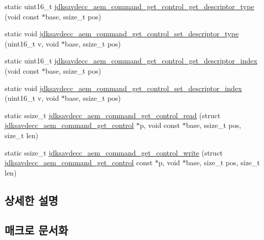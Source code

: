 \begin{DoxyCompactItemize}
static uint16\+\_\+t \hyperlink{group__command__get__control_ga90f0fc2993ae0173e6b9ce2c6020440d}{jdksavdecc\+\_\+aem\+\_\+command\+\_\+get\+\_\+control\+\_\+get\+\_\+descriptor\+\_\+type} (void const $\ast$base, ssize\+\_\+t pos)
\item 
static void \hyperlink{group__command__get__control_ga5b685187fafd639322cdee542dcd80d2}{jdksavdecc\+\_\+aem\+\_\+command\+\_\+get\+\_\+control\+\_\+set\+\_\+descriptor\+\_\+type} (uint16\+\_\+t v, void $\ast$base, ssize\+\_\+t pos)
\item 
static uint16\+\_\+t \hyperlink{group__command__get__control_ga92af56dbbaac901e328c3c1b60b7ca47}{jdksavdecc\+\_\+aem\+\_\+command\+\_\+get\+\_\+control\+\_\+get\+\_\+descriptor\+\_\+index} (void const $\ast$base, ssize\+\_\+t pos)
\item 
static void \hyperlink{group__command__get__control_ga0782470ec152cdffee65c219ec629c03}{jdksavdecc\+\_\+aem\+\_\+command\+\_\+get\+\_\+control\+\_\+set\+\_\+descriptor\+\_\+index} (uint16\+\_\+t v, void $\ast$base, ssize\+\_\+t pos)
\item 
static ssize\+\_\+t \hyperlink{group__command__get__control_gae47bc21ffda3bcac5c34a5a619e56c79}{jdksavdecc\+\_\+aem\+\_\+command\+\_\+get\+\_\+control\+\_\+read} (struct \hyperlink{structjdksavdecc__aem__command__get__control}{jdksavdecc\+\_\+aem\+\_\+command\+\_\+get\+\_\+control} $\ast$p, void const $\ast$base, ssize\+\_\+t pos, size\+\_\+t len)
\item 
static ssize\+\_\+t \hyperlink{group__command__get__control_ga5141e3d532e078989ac6d66373910cdd}{jdksavdecc\+\_\+aem\+\_\+command\+\_\+get\+\_\+control\+\_\+write} (struct \hyperlink{structjdksavdecc__aem__command__get__control}{jdksavdecc\+\_\+aem\+\_\+command\+\_\+get\+\_\+control} const $\ast$p, void $\ast$base, size\+\_\+t pos, size\+\_\+t len)
\end{DoxyCompactItemize}


\subsection{상세한 설명}


\subsection{매크로 문서화}
